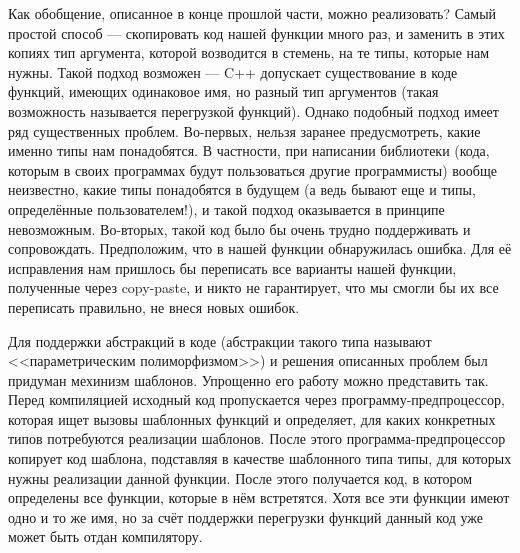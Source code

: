 \documentclass{book}
\begin{document}
Как обобщение, описанное в конце прошлой части, можно реализовать? Самый простой способ ---
скопировать код нашей функции много раз, и заменить в этих копиях тип аргумента, которой возводится
в стемень, на те типы, которые нам нужны. Такой подход возможен --- C++ допускает существование в
коде функций, имеющих одинаковое имя, но разный тип аргументов (такая возможность называется
перегрузкой функций). Однако подобный подход имеет ряд существенных проблем. Во-первых, нельзя
заранее предусмотреть, какие именно типы нам понадобятся. В частности, при написании библиотеки
(кода, которым в своих программах будут пользоваться другие программисты) вообще неизвестно, какие
типы понадобятся в будущем (а ведь бывают еще и типы, определённые пользователем!), и такой подход
оказывается в принципе невозможным. Во-вторых, такой код было бы очень трудно поддерживать и
сопровождать. Предположим, что в нашей функции обнаружилась ошибка. Для её исправления нам пришлось
бы переписать все варианты нашей функции, полученные через copy-paste, и никто не гарантирует, что
мы смогли бы их все переписать правильно, не внеся новых ошибок.

Для поддержки абстракций в коде (абстракции такого типа называют <<параметрическим полиморфизмом>>)
и решения описанных проблем был придуман мехинизм шаблонов. Упрощенно его работу можно представить
так. Перед компиляцией исходный код пропускается через программу-предпроцессор, которая ищет вызовы
шаблонных функций и определяет, для каких конкретных типов потребуются реализации шаблонов. После
этого программа-предпроцессор копирует код шаблона, подставляя в качестве шаблонного типа типы, для
которых нужны реализации данной функции. После этого получается код, в котором определены все
функции, которые в нём встретятся. Хотя все эти функции имеют одно и то же имя, но за счёт
поддержки перегрузки функций данный код уже может быть отдан компилятору.
\end{document}
